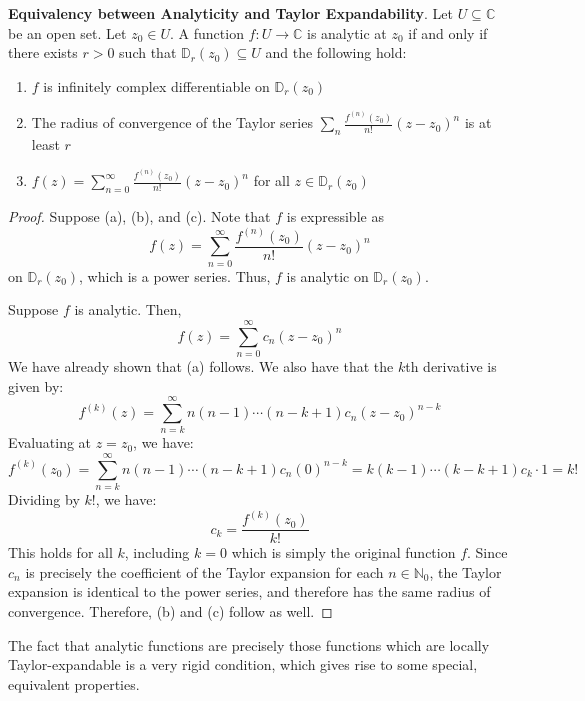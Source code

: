 \begin{framed}
    \textbf{Equivalency between Analyticity and Taylor Expandability}. Let $U\subseteq\mathbb{C}$ be an open set. Let $z_0\in U$. A function $f:U\to\mathbb{C}$ is analytic at $z_0$ if and only if there exists $r>0$ such that $\mathbb{D}_r(z_0)\subseteq U$ and the following hold: \vspace{-1em}\begin{enumerate}
        \item[(a)] $f$ is infinitely complex differentiable on $\mathbb{D}_r(z_0)$
        \item[(b)] The radius of convergence of the Taylor series $\displaystyle\sum_n \frac{f^{(n)}(z_0)}{n!} (z-z_0)^n$ is at least $r$
        \item[(c)] $f(z)=\displaystyle\sum_{n=0}^\infty \frac{f^{(n)}(z_0)}{n!}(z-z_0)^n$ for all $z\in\mathbb{D}_r(z_0)$
    \end{enumerate}

    \begin{proof}
        Suppose (a), (b), and (c). Note that $f$ is expressible as \[f(z)=\sum_{n=0}^\infty \frac{f^{(n)}(z_0)}{n!} (z-z_0)^n\] on $\mathbb{D}_r(z_0)$, which is a power series. Thus, $f$ is analytic on $\mathbb{D}_r(z_0)$.

        Suppose $f$ is analytic. Then, \[f(z) = \sum_{n=0}^\infty c_n (z-z_0)^n\] We have already shown that (a) follows. We also have that the $k$th derivative is given by: \[f^{(k)}(z) = \sum_{n=k}^\infty n(n-1)\cdots(n-k+1)c_n (z-z_0)^{n-k}\] Evaluating at $z=z_0$, we have: \[f^{(k)}(z_0)=\sum_{n=k}^\infty n(n-1)\cdots(n-k+1)c_n(0)^{n-k} = k(k-1)\cdots(k-k+1)c_k \cdot 1 = k!\] Dividing by $k!$, we have: \[c_k = \frac{f^{(k)}(z_0)}{k!}\] This holds for all $k$, including $k=0$ which is simply the original function $f$. Since $c_n$ is precisely the coefficient of the Taylor expansion for each $n\in\mathbb{N}_0$, the Taylor expansion is identical to the power series, and therefore has the same radius of convergence. Therefore, (b) and (c) follow as well.
    \end{proof}
\end{framed}

The fact that analytic functions are precisely those functions which are locally Taylor-expandable is a very rigid condition, which gives rise to some special, equivalent properties.

